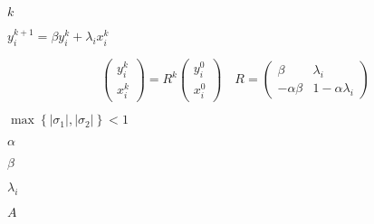 \documentclass[10pt]{book}
\begin{document}
\begin{mdSnippets}
\begin{mdInlineSnippet}[8ce4b16b22b58894aa86c421e8759df3]%
$k$\end{mdInlineSnippet}%
\begin{mdInlineSnippet}[795cb8c493e4ff97555e1621f5cbfb8b]%
$y_{i}^{k+1} =\beta y_{i}^{k}+\lambda_{i} x_{i}^{k}$\end{mdInlineSnippet}%
\begin{mdDisplaySnippet}%
\[%
\left(\begin{array}{c}
y_{i}^{k} \\
x_{i}^{k}
\end{array}\right)=R^{k}\left(\begin{array}{c}
y_{i}^{0} \\
x_{i}^{0}
\end{array}\right) \quad R=\left(\begin{array}{cc}
\beta & \lambda_{i} \\
-\alpha \beta & 1-\alpha \lambda_{i}
\end{array}\right)
\]%
\end{mdDisplaySnippet}%
\begin{mdInlineSnippet}[8dd95570a7a452c29551641142a4b20a]%
$\max \left\{\left|\sigma_{1}\right|,\left|\sigma_{2}\right|\right\}<1$\end{mdInlineSnippet}%
\begin{mdInlineSnippet}[7b7f9dbfea05c83784f8b85149852f08]%
$\alpha$\end{mdInlineSnippet}%
\begin{mdInlineSnippet}%
$\beta$\end{mdInlineSnippet}%
\begin{mdInlineSnippet}[5614371f803f8a78b18b27391549a107]%
$\lambda_i$\end{mdInlineSnippet}%
\begin{mdInlineSnippet}[7fc56270e7a70fa81a5935b72eacbe29]%
$A$\end{mdInlineSnippet}%

\end{mdSnippets}
\end{document}
